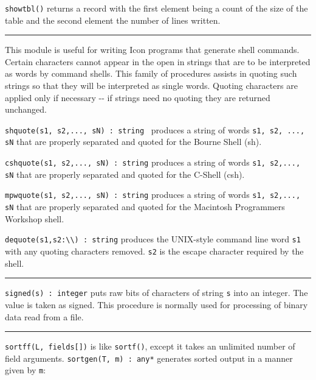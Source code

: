 \texttt{showtbl()} returns a record with the first element being a count
of the size of the table and the second element the number of lines
written. 

\vspace{0.25cm}\hrule{}

This module is useful for writing Icon programs that generate
shell commands. Certain characters cannot appear
in the open in strings that are to be interpreted as
{\textquotedbl}words{\textquotedbl} by command shells. This family of
procedures assists in quoting such strings so that they will be
interpreted as single words. Quoting characters are applied only if
necessary -{}- if strings need no quoting they are returned unchanged.


\texttt{shquote(s1, s2,..., sN) : string} \ produces a string of words
\texttt{s1, s2, ..., sN} that are properly separated and quoted for the
Bourne Shell (sh).

\texttt{cshquote(s1, s2,..., sN) : string} produces a string of words
\texttt{s1, s2,..., sN} that are properly separated and quoted for the
C-Shell (csh).

\texttt{mpwquote(s1, s2,..., sN) : string} produces a string of words
\texttt{s1, s2,..., sN} that are properly separated and quoted for the
Macintosh Programmer{\textquotesingle}s Workshop shell.

\texttt{dequote(s1,s2:{\textquotedbl}{\textbackslash}{\textbackslash}{\textquotedbl})
: string} produces the UNIX-style command line word \texttt{s1} with
any quoting characters removed. \texttt{s2} is the escape character
required by the shell.

\vspace{0.25cm}\hrule{}

\texttt{signed(s) : integer} puts raw bits of characters of string
\texttt{s} into an integer. The value is taken as signed. This
procedure is normally used for processing of binary data read from a
file.

\vspace{0.25cm}\hrule{}

\texttt{sort}\texttt{ff(L, fields[])} is like
\texttt{sortf()}, except it takes an unlimited number of field arguments. \texttt{sortgen(T, m) : any*} generates sorted
output in a manner given by \texttt{m}:

